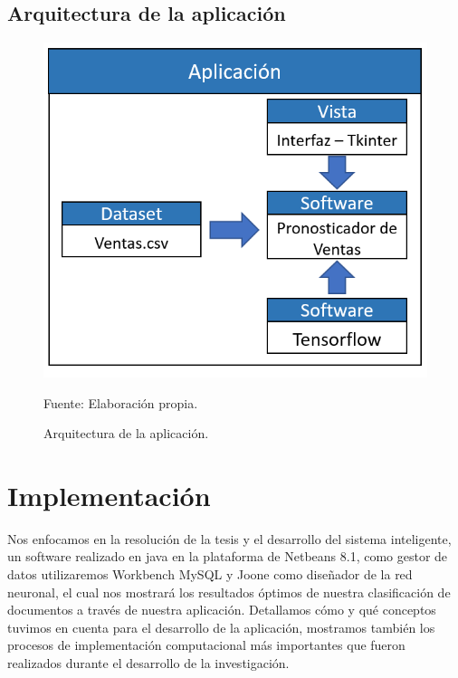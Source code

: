 \subsection{Arquitectura de la aplicación}
\begin{figure}[h!]
	\centering
		\includegraphics[scale=0.4]{imagenes/arquitecturaaplicacion.png}
		\caption{Arquitectura de la aplicación.}
	\begin{center}
    Fuente: Elaboración propia.
    \end{center}
	\label{fig:arquitecturaaaa}
\end{figure}

\section{Implementación}
Nos enfocamos en la resolución de la tesis y el desarrollo del sistema inteligente, un software realizado en java en la plataforma de Netbeans 8.1, como gestor de datos utilizaremos Workbench MySQL y Joone como diseñador de la red neuronal, el cual nos mostrará los resultados óptimos de nuestra clasificación de documentos a través de nuestra aplicación. Detallamos cómo y qué conceptos tuvimos en cuenta para el desarrollo de la aplicación, mostramos también los procesos de implementación computacional más importantes que fueron realizados durante el desarrollo de la investigación.


